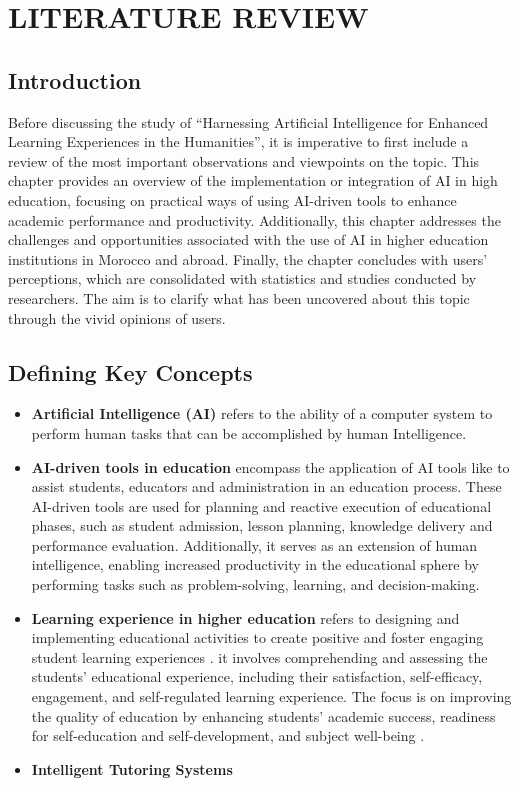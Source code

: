 \chapter{LITERATURE REVIEW}\label{ch:literature-review}
\section{Introduction}\label{sec:introduction}
\justifying
Before discussing the study of ``Harnessing Artificial Intelligence for Enhanced
Learning Experiences in the Humanities'', it is imperative to first include a review of the most
important observations and viewpoints on the topic.
This chapter provides an overview of
the implementation or integration of AI in high education, focusing on practical ways of using AI-driven tools
to enhance academic performance and productivity.
Additionally,
this chapter addresses the challenges and opportunities associated with the use of AI in higher education
institutions in Morocco and abroad.
Finally, the chapter concludes with users' perceptions, which are consolidated with
statistics and studies conducted by researchers.
The aim is to clarify
what has been uncovered about this topic through the vivid opinions of users.

\section{Defining Key Concepts}\label{sec:defining-key-concepts}
\begin{itemize}
	\item \textbf{Artificial Intelligence (AI)}\label{AI} refers to the ability of a computer system to perform human
	tasks that can be accomplished by human Intelligence\citep{sadiku_ai_2021}.
	\item \textbf{AI-driven tools in education} encompass the application of AI tools like  to assist 
	students, educators and administration in an education process.
	These AI-driven tools are used for planning and reactive execution of educational phases, such as
	student admission, lesson planning, knowledge delivery and performance evaluation\citep{mallik_proactive_2023}.
	Additionally, it serves as an extension of human intelligence, enabling
	increased productivity in the educational sphere by performing tasks
	such as problem-solving, learning, and decision-making\citep{cheng_widespread_2023}.
	\item \textbf{Learning experience in higher education}  refers to designing and implementing educational activities to create 
	positive and foster engaging student learning experiences \citep{kang_supporting_2023}.
	it involves comprehending and assessing the students’ educational experience, including 
	their satisfaction, self-efficacy, engagement, and self-regulated learning experience\citep{lyz_students_2022}.
	The focus is on improving the quality of education by enhancing students’ academic success, 
	readiness for self-education and self-development, and subject well-being \citep{iordache-platis_building_2018}.
	\item \textbf{Intelligent Tutoring Systems}
\end{itemize}
